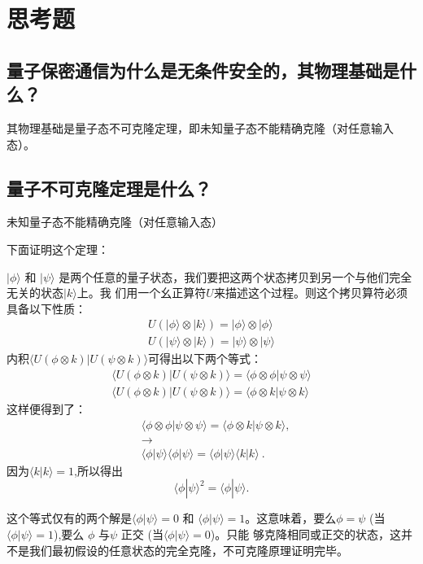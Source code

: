 \documentclass[a4paper,UTF8]{ctexart}
\begin{document}
\section{思考题}

\subsection{量子保密通信为什么是无条件安全的，其物理基础是什么？}

其物理基础是量子态不可克隆定理，即未知量子态不能精确克隆（对任意输入态）。

\subsection{量子不可克隆定理是什么？}

未知量子态不能精确克隆（对任意输入态）

下面证明这个定理：

$|\phi\rangle$ 和 $|\psi\rangle$ 是两个任意的量子状态，我们要把这两个状态拷贝到另一个与他们完全无关的状态$|k\rangle$上。我
们用一个幺正算符$U$来描述这个过程。则这个拷贝算符必须具备以下性质：
$$\begin{array}{l}U(|\phi\rangle\otimes|k\rangle)=|\phi\rangle\otimes|\phi\rangle\\U(|\psi\rangle\otimes|k\rangle)=|\psi\rangle\otimes|\psi\rangle\end{array}$$
内积$\langle U(\phi\otimes k)|U(\psi\otimes k)\rangle$可得出以下两个等式：
$$\begin{array}{l}\langle U(\phi\otimes k)|U(\psi\otimes k)\rangle=\langle\phi\otimes\phi|\psi\otimes\psi\rangle\\\langle U(\phi\otimes k)|U(\psi\otimes k)\rangle=\langle\phi\otimes k|\psi\otimes k\rangle\end{array}$$
这样便得到了：
$$\begin{aligned}&\langle\phi\otimes\phi|\psi\otimes\psi\rangle=\langle\phi\otimes k|\psi\otimes k\rangle,\\&\to\\&\langle\phi|\psi\rangle\langle\phi|\psi\rangle=\langle\phi|\psi\rangle\langle k|k\rangle\:.\end{aligned}$$
因为$\langle k|k\rangle=1$,所以得出
$$\langle\phi|\psi\rangle^{2}=\langle\phi|\psi\rangle.$$

这个等式仅有的两个解是$\langle\phi|\psi\rangle=0$ 和 $\langle\phi|\psi\rangle=1$。这意味着，要么$\phi=\psi$ (当$\langle\phi|\psi\rangle=1$),要么 $\phi$ 与$\psi$ 正交 (当$\langle\phi|\psi\rangle=0$)。只能
够克降相同或正交的状态，这并不是我们最初假设的任意状态的完全克隆，不可克隆原理证明完毕。
\end{document}

